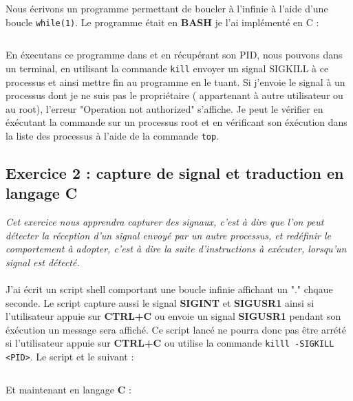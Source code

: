 Nous écrivons un programme permettant de boucler à l'infinie à l'aide d'une boucle \texttt{while(1)}. Le programme était en \textbf{BASH} je l'ai implémenté en C :
\inputminted[linenos,firstline=8,lastline=14]{cpp}{../sources/cpp/TP5-6/ex1.c}

En éxecutans ce programme dans et en récupérant son PID, nous pouvons dans un terminal, en utilisant la commande \texttt{kill} envoyer un signal SIGKILL à ce processus et ainsi mettre fin au programme en le tuant. Si j'envoie le signal à un processus dont je ne suis pas le propriétaire ( appartenant à autre utilisateur ou au root), l'erreur "Operation not authorized" s'affiche. Je peut le vérifier en éxécutant la commande sur un processus root et en vérificant son éxécution dans la liste des processus à l'aide de la commande \texttt{top}.

\subsection{Exercice 2 : capture de signal et traduction en langage C}
\textit{Cet exercice nous apprendra capturer des signaux, c’est à dire que l’on peut détecter la réception d’un signal envoyé par un autre processus, et redéfinir le comportement à adopter, c’est à dire la suite d’instructions à exécuter, lorsqu’un signal est détecté.}
\\\\
J'ai écrit un script shell comportant une boucle infinie affichant un "." chqaue seconde. Le script capture aussi le signal \textbf{SIGINT} et \textbf{SIGUSR1} ainsi si l'utilisateur appuie sur \textbf
{CTRL+C} ou envoie un signal \textbf{SIGUSR1} pendant son éxécution un message sera affiché. Ce script lancé ne pourra donc pas être arrété si l'utilisateur appuie sur \textbf{CTRL+C} ou utilise la commande \texttt{killl -SIGKILL <PID>}.
Le script et le suivant :
\inputminted{bash}{../sources/cpp/TP5-6/ex2-boucle.sh}
Et maintenant en langage \textbf{C} :
\inputminted[linenos,firstline=10,lastline=32]{cpp}{../sources/cpp/TP5-6/ex2.c}

